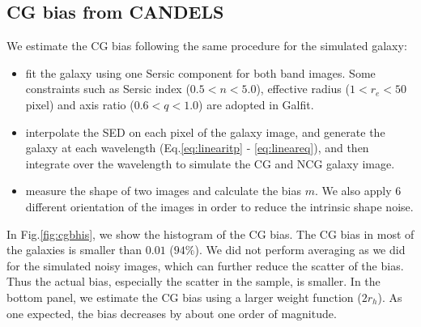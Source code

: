 \documentclass[useAMS,usenatbib]{mn2e}
\begin{document}
\subsection{CG bias from CANDELS}
We estimate the CG bias following the same procedure for the simulated galaxy:
\begin{itemize}
  \item
    fit the galaxy using one Sersic component for both band
    images. Some constraints such as Sersic index ($0.5<n<5.0$),
    effective radius ($1<r_e<50$ pixel) and axis ratio ($0.6<q<1.0$)
    are adopted in Galfit.
  \item
    interpolate the SED on each pixel of the galaxy image, and
    generate the galaxy at each wavelength (Eq.\ref{eq:linearitp} -
    \ref{eq:lineareq}), and then integrate over the wavelength to
    simulate the CG and NCG galaxy image.
  \item
    measure the shape of two images and calculate the bias $m$. We
    also apply $6$ different orientation of the images in order
    to reduce the intrinsic shape noise.
\end{itemize}
%
In Fig.\ref{fig:cgbhis}, we show the histogram of the CG bias. The CG
bias in most of the galaxies is smaller than $0.01$ ($94\%$). We did
not perform averaging as we did for the simulated noisy images, which
can further reduce the scatter of the bias. Thus the actual bias,
especially the scatter in the sample, is smaller. In the bottom
panel, we estimate the CG bias using a larger weight function
($2r_h$). As one expected, the bias decreases by about one order of
magnitude.

%
\end{document}
